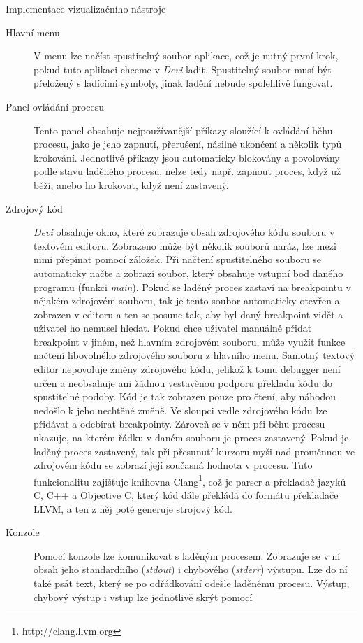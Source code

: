 \documentclass[bc,male,python,dept460]{diploma}						%
\begin{document}
\begin{section}{Implementace vizualizačního nástroje}
	\begin{description}
		\item[Hlavní menu] V menu lze načíst spustitelný soubor aplikace, což je nutný první krok, pokud tuto aplikaci chceme v \textit{Devi} ladit.
			Spustitelný soubor musí být přeložený s ladícími symboly, jinak ladění nebude spolehlivě fungovat.
		\item[Panel ovládání procesu] Tento panel obsahuje nejpoužívanější příkazy sloužící k ovládání běhu procesu, jako je jeho zapnutí, přerušení, násilné
			ukončení a několik typů krokování. Jednotlivé příkazy jsou automaticky blokovány a povolovány podle stavu laděného procesu, nelze tedy např. zapnout
			proces, když už běží, anebo ho krokovat, když není zastavený.
		\item[Zdrojový kód] \textit{Devi} obsahuje okno, které zobrazuje obsah zdrojového kódu souboru v textovém editoru. Zobrazeno může být několik souborů naráz,
			lze mezi nimi přepínat pomocí záložek. Při načtení spustitelného souboru se automaticky načte a zobrazí soubor, který obsahuje vstupní bod daného programu
			(funkci \textit{main}). Pokud se laděný proces zastaví na breakpointu v nějakém zdrojovém souboru, tak je tento soubor automaticky otevřen a zobrazen
			v editoru a ten se posune tak, aby byl daný breakpoint vidět a uživatel ho nemusel hledat. Pokud chce uživatel manuálně přidat breakpoint v jiném, než
			hlavním zdrojovém souboru, může využít funkce načtení libovolného zdrojového souboru z hlavního menu. Samotný textový editor nepovoluje změny zdrojového
			kódu, jelikož k tomu debugger není určen a neobsahuje ani žádnou vestavěnou podporu překladu kódu do spustitelné podoby. Kód je tak zobrazen pouze pro
			čtení, aby náhodou nedošlo k jeho nechtěné změně. Ve sloupci vedle zdrojového kódu lze přidávat a odebírat breakpointy. Zároveň se v něm při běhu procesu
			ukazuje, na kterém řádku v daném souboru je proces zastavený. Pokud je laděný proces zastavený, tak při přesunutí kurzoru myši nad proměnnou ve zdrojovém
			kódu se zobrazí její současná hodnota v procesu. Tuto funkcionalitu zajišťuje knihovna Clang\footnote{http://clang.llvm.org}, což je parser a překladač
			jazyků C, C++ a Objective C, který kód dále překládá do formátu překladače LLVM, a ten z něj poté generuje strojový kód.
		\item[Konzole] Pomocí konzole lze komunikovat s laděným procesem. Zobrazuje se v ní obsah jeho standardního (\textit{stdout}) i chybového (\textit{stderr})
			výstupu. Lze do ní také psát text, který se po odřádkování odešle laděnému procesu. Výstup, chybový výstup i vstup lze jednotlivě skrýt pomocí

\end{description}
\end{section}
\end{document}
